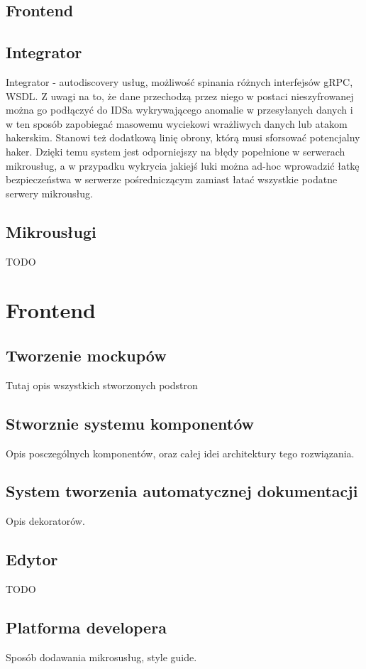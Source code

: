 \documentclass[licencjacka]{pracamgr}
\begin{document}
\subsection{Frontend}

\subsection{Integrator}
Integrator - autodiscovery usług, możliwość spinania różnych interfejsów gRPC, WSDL. 
Z uwagi na to, że dane przechodzą przez niego w postaci nieszyfrowanej można
go podłączyć do IDSa wykrywającego anomalie w przesyłanych danych i w ten sposób
zapobiegać masowemu wyciekowi wrażliwych danych lub atakom hakerskim. Stanowi też
dodatkową linię obrony, którą musi sforsować potencjalny haker. Dzięki temu system jest
odporniejszy na błędy popełnione w serwerach mikrousług, a w przypadku wykrycia
jakiejś luki można ad-hoc wprowadzić łatkę bezpieczeństwa w serwerze pośredniczącym
zamiast łatać wszystkie podatne serwery mikrousług.

\subsection{Mikrousługi}
TODO

\section{Frontend}

\subsection{Tworzenie mockupów}
Tutaj opis wszystkich stworzonych podstron
\subsection{Stworznie systemu komponentów}
Opis posczególnych komponentów, oraz całej idei architektury tego rozwiązania.
\subsection{System tworzenia automatycznej dokumentacji}
Opis dekoratorów.
\subsection{Edytor}
TODO
\subsection{Platforma developera}
Sposób dodawania mikrosusług, style guide.
\end{document}
